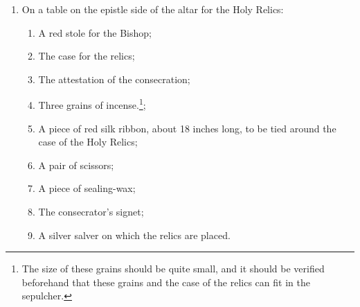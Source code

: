 \documentclass[letterpaper]{report}
\begin{document}
{\begin{enumerate}[label=\Roman*.]
\begin{enumerate}[label=\arabic*.]
                \item A small urn or tabernacle, ornamented with red silk, in
                    which the case of the relics will be placed. A silver
                    salver with a small red cloth may substitute;
                
                \item Near the altar a bier for carrying the relics;

                \item Two candlesticks.

            \end{enumerate}

        \item On a table on the epistle side of the altar for the Holy Relics:

            \begin{enumerate}[label=\arabic*.]

                \item A red stole for the Bishop;
                    
                \item The case for the relics;

                \item The attestation of the consecration;

                \item Three grains of incense.\footnote{The size of these
                    grains should be quite small, and it should be verified
                    beforehand that these grains and the case of the relics can
                    fit in the sepulcher.};

                \item A piece of red silk ribbon, about 18 inches long, to be
                    tied around the case of the Holy Relics;

                \item A pair of scissors;

                \item A piece of sealing-wax;

                \item The consecrator's signet;

                \item A silver salver on which the relics are placed.

            \end{enumerate}


\end{enumerate}}
\end{document}
